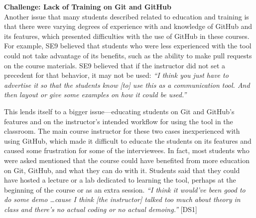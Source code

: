 

\textbf{Challenge: Lack of Training on Git and GitHub} \\
Another issue that many students described related to education and training is that there were varying degrees of experience with and knowledge of GitHub and its features, which presented difficulties with the use of GitHub in these courses. For example, SE9 believed that students who were less experienced with the tool could not take advantage of its benefits, such as the ability to make pull requests on the course materials. SE9 believed that if the instructor did not set a precedent for that behavior, it may not be used: \textit{``I think you just have to advertise it so that the students know [to] use this as a communication tool. And then layout or give some examples on how it could be used.''}

This lends itself to a bigger issue---educating students on Git and GitHub's features and on the instructor's intended workflow for using the tool in the classroom. The main course instructor for these two cases inexperienced with using GitHub, which made it difficult to educate the students on its features and caused some frustration for some of the interviewees. In fact, most students who were asked mentioned that the course could have benefited from more education on Git, GitHub, and what they can do with it. Students said that they could have hosted a lecture or a lab dedicated to learning the tool, perhaps at the beginning of the course or as an extra session. \textit{``I think it would've been good to do some demo \ldots cause I think [the instructor] talked too much about theory in class and there's no actual coding or no actual demoing.''} [DS1]

